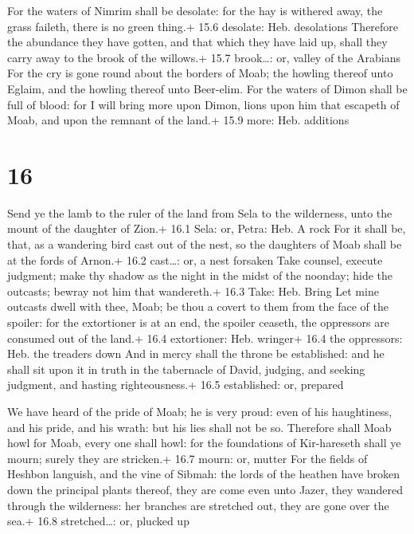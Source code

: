  For the waters of Nimrim shall be desolate: for the hay is
withered away, the grass faileth, there is no green thing.+ 15.6
desolate: Heb. desolations  Therefore the abundance they
have gotten, and that which they have laid up, shall they carry away to
the brook of the willows.+ 15.7 brook\ldots: or, valley of the Arabians
 For the cry is gone round about the borders of Moab; the
howling thereof unto Eglaim, and the howling thereof unto Beer-elim.
 For the waters of Dimon shall be full of blood: for I will
bring more upon Dimon, lions upon him that escapeth of Moab, and upon
the remnant of the land.+ 15.9 more: Heb. additions

\hypertarget{section-15}{%
\section{16}\label{section-15}}

 Send ye the lamb to the ruler of the land from Sela to the
wilderness, unto the mount of the daughter of Zion.+ 16.1 Sela: or,
Petra: Heb. A rock  For it shall be, that, as a wandering
bird cast out of the nest, so the daughters of Moab shall be at the
fords of Arnon.+ 16.2 cast\ldots: or, a nest forsaken  Take
counsel, execute judgment; make thy shadow as the night in the midst of
the noonday; hide the outcasts; bewray not him that wandereth.+ 16.3
Take: Heb. Bring  Let mine outcasts dwell with thee, Moab;
be thou a covert to them from the face of the spoiler: for the
extortioner is at an end, the spoiler ceaseth, the oppressors are
consumed out of the land.+ 16.4 extortioner: Heb. wringer+ 16.4 the
oppressors: Heb. the treaders down  And in mercy shall the
throne be established: and he shall sit upon it in truth in the
tabernacle of David, judging, and seeking judgment, and hasting
righteousness.+ 16.5 established: or, prepared

 We have heard of the pride of Moab; he is very proud:
even of his haughtiness, and his pride, and his wrath: but his lies
shall not be so.  Therefore shall Moab howl for Moab, every
one shall howl: for the foundations of Kir-hareseth shall ye mourn;
surely they are stricken.+ 16.7 mourn: or, mutter  For the
fields of Heshbon languish, and the vine of Sibmah: the lords of the
heathen have broken down the principal plants thereof, they are come
even unto Jazer, they wandered through the wilderness: her branches are
stretched out, they are gone over the sea.+ 16.8 stretched\ldots: or,
plucked up

